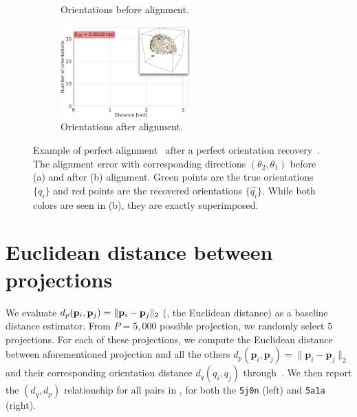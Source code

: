 \begin{figure}[ht!]
\begin{minipage}[t]{0.64\linewidth}
\begin{subfigure}[t]{0.48\linewidth}
            \caption{Orientations before alignment.}
        \end{subfigure}
        \hfill
        \begin{subfigure}[t]{0.48\linewidth}
            \centering
            \includegraphics[height=3.5cm]{figures/AfterAA.pdf}
            \caption{Orientations after alignment.}
        \end{subfigure}
        \caption{%
            Example of perfect alignment~ after a perfect orientation recovery~.
            The alignment error with corresponding directions $(\theta_2, \theta_1)$ before (a) and after (b) alignment.
            Green points are the true orientations $\{q_i\}$ and red points are the recovered orientations $\{\widehat{q_i}\}$.
            While both colors are seen in (b), they are exactly superimposed.
        }\label{fig:5j0n-aa-loss-perfect-distances}
    \end{minipage}
\end{figure}

\section{Euclidean distance between projections}\label{apx:results:distance-estimation}


 We evaluate $d_p(\mathbf{p}_i, \mathbf{p}_j) = \Vert \mathbf{p}_i - \mathbf{p}_j \Vert_2$ (\ie, the Euclidean distance) as a baseline distance estimator.
From $P = 5,000$ possible projection, we randomly select $5$ projections.
For each of these projections, we compute the Euclidean distance between aforementioned projection and all the others $d_p(\mathbf{p}_i,\mathbf{p}_j)=\lVert\mathbf{p}_i-\mathbf{p}_j\rVert_2$ and their corresponding orientation distance $d_q(q_i,q_j)$ through~.
We then report the $(d_q,d_p)$ relationship for all pairs in , for both the \texttt{5j0n} (left) and \texttt{5a1a} (right).

